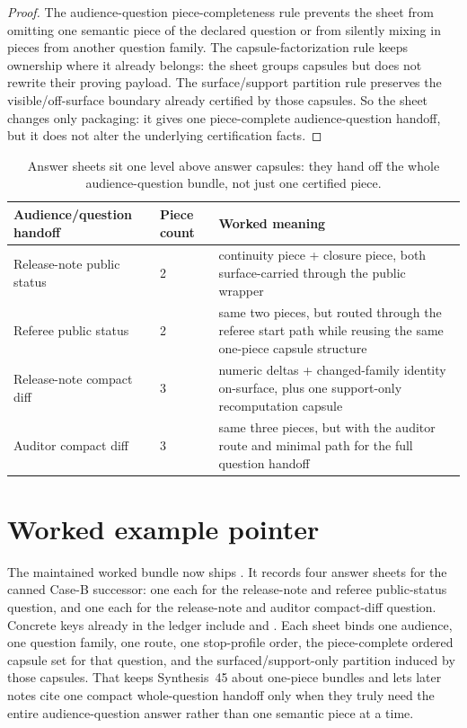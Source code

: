 \documentclass[11pt]{article}
\begin{document}
\begin{proof}
The audience-question piece-completeness rule prevents the sheet from omitting one semantic piece of the declared question or from silently mixing in pieces from another question family.
The capsule-factorization rule keeps ownership where it already belongs: the sheet groups capsules but does not rewrite their proving payload.
The surface/support partition rule preserves the visible/off-surface boundary already certified by those capsules.
So the sheet changes only packaging: it gives one piece-complete audience-question handoff, but it does not alter the underlying certification facts.\qedhere
\end{proof}

\begin{table}[t]
\centering
\small
\begin{tabularx}{\linewidth}{@{}l l X@{}}
\toprule
Audience/question handoff & Piece count & Worked meaning \\
\midrule
Release-note public status & 2 & continuity piece + closure piece, both surface-carried through the public wrapper \\
Referee public status & 2 & same two pieces, but routed through the referee start path while reusing the same one-piece capsule structure \\
Release-note compact diff & 3 & numeric deltas + changed-family identity on-surface, plus one support-only recomputation capsule \\
Auditor compact diff & 3 & same three pieces, but with the auditor route and minimal path for the full question handoff \\
\bottomrule
\end{tabularx}
\caption{Answer sheets sit one level above answer capsules: they hand off the whole audience-question bundle, not just one certified piece.}
\label{tab:answersheets}
\end{table}

\section{Worked example pointer}
The maintained worked bundle now ships .\cite{series:workedexample}
It records four answer sheets for the canned Case-B successor: one each for the release-note and referee public-status question, and one each for the release-note and auditor compact-diff question.
Concrete keys already in the ledger include  and .
Each sheet binds one audience, one question family, one route, one stop-profile order, the piece-complete ordered capsule set for that question, and the surfaced/support-only partition induced by those capsules.
That keeps Synthesis~45 about one-piece bundles and lets later notes cite one compact whole-question handoff only when they truly need the entire audience-question answer rather than one semantic piece at a time.\cite{series:challengeanswercapsules}
\end{document}
